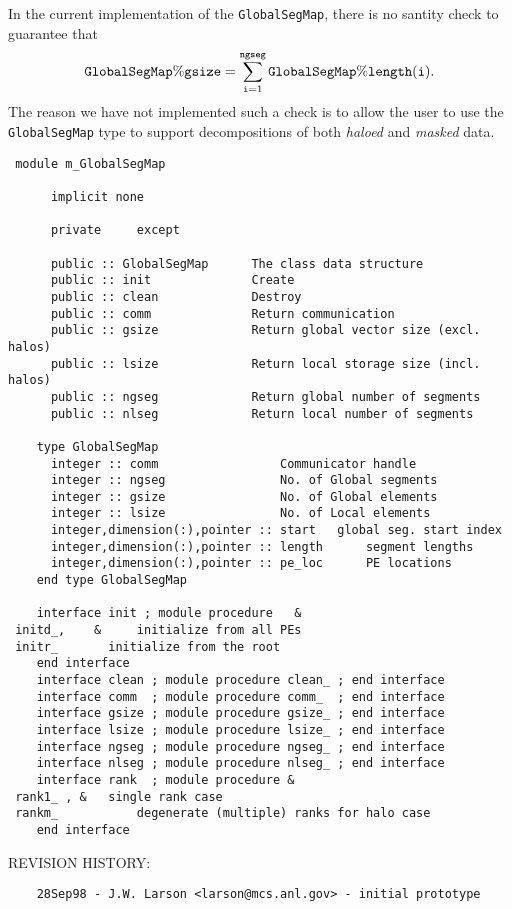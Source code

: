   In the current implementation of the {\tt GlobalSegMap}, there is no
  santity check to guarantee that 
 $${\tt GlobalSegMap\%gsize} = \sum_{{\tt i}=1}^{\tt ngseg} 
  {\tt GlobalSegMap\%length(i)} . $$
  The reason we have not implemented such a check is to allow the user
  to use the {\tt GlobalSegMap} type to support decompositions of both 
  {\em haloed} and {\em masked} data.
 
\begin{verbatim} 
 module m_GlobalSegMap
 
      implicit none
 
      private	  except
 
      public :: GlobalSegMap	  The class data structure
      public :: init              Create
      public :: clean             Destroy
      public :: comm              Return communication
      public :: gsize             Return global vector size (excl. halos)
      public :: lsize             Return local storage size (incl. halos)
      public :: ngseg             Return global number of segments
      public :: nlseg             Return local number of segments
 
    type GlobalSegMap
      integer :: comm				  Communicator handle
      integer :: ngseg				  No. of Global segments
      integer :: gsize				  No. of Global elements
      integer :: lsize				  No. of Local elements
      integer,dimension(:),pointer :: start	  global seg. start index
      integer,dimension(:),pointer :: length	  segment lengths
      integer,dimension(:),pointer :: pe_loc	  PE locations
    end type GlobalSegMap
 
    interface init ; module procedure	&
 initd_,	&	  initialize from all PEs
 initr_		  initialize from the root
    end interface
    interface clean ; module procedure clean_ ; end interface
    interface comm  ; module procedure comm_  ; end interface
    interface gsize ; module procedure gsize_ ; end interface
    interface lsize ; module procedure lsize_ ; end interface
    interface ngseg ; module procedure ngseg_ ; end interface
    interface nlseg ; module procedure nlseg_ ; end interface
    interface rank  ; module procedure &
 rank1_ , &	  single rank case
 rankm_	          degenerate (multiple) ranks for halo case
    end interface
 \end{verbatim}{\sf REVISION HISTORY:}
\begin{verbatim}  	28Sep98 - J.W. Larson <larson@mcs.anl.gov> - initial prototype\end{verbatim}
 
